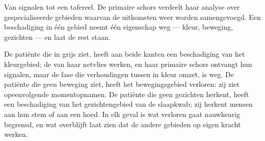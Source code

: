 \begin{omfigure}

{\small Van signalen tot een tafereel. De primaire schors verdeelt haar
analyse over gespecialiseerde gebieden waarvan de uitkomsten weer worden
samengevoegd. Een beschadiging in één gebied neemt één eigenschap weg ---
kleur, beweging, gezichten --- en laat de rest staan.}
\end{omfigure}

\begin{example}\label{ex:g11:vision-and-brain:patients}
De patiënte die in grijs ziet, heeft aan beide kanten een beschadiging van
het kleurgebied; de  van haar netvlies werken, en haar primaire
schors ontvangt hun signalen, maar de fase die verhoudingen tussen
 in kleur omzet, is weg. De patiënte die geen beweging ziet,
heeft het bewegingsgebied verloren: zij ziet opeenvolgende
momentopnamen. De patiënte die geen gezichten herkent, heeft een
beschadiging van het gezichtengebied van de slaapkwab; zij herkent mensen
aan hun stem of aan een hoed. In elk geval is wat verloren gaat nauwkeurig
begrensd, en wat overblijft laat zien dat de andere gebieden op eigen
kracht werken.
\end{example}


